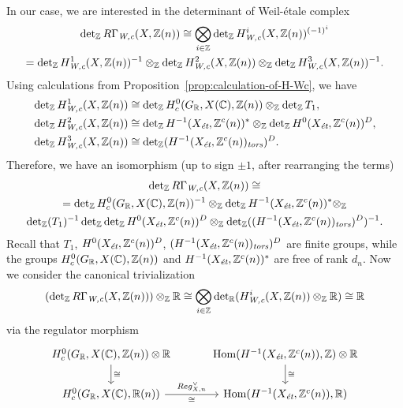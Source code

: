 \documentclass[draft]{article}
\numberwithin{equation}{section}
\begin{document}
In our case, we are interested in the determinant of Weil-\'{e}tale complex
\begin{multline*}
  \det_\ZZ R\Gamma_\Wc (X, \ZZ(n)) \cong
  \bigotimes_{i \in \ZZ} \det_\ZZ H^i_\Wc (X, \ZZ(n))^{(-1)^i} \\
  =
  \det_\ZZ H^1_\Wc (X, \ZZ(n))^{-1} \otimes_\ZZ
  \det_\ZZ H^2_\Wc (X, \ZZ(n)) \otimes_\ZZ
  \det_\ZZ H^3_\Wc (X, \ZZ(n))^{-1}.
\end{multline*}
Using calculations from Proposition~\ref{prop:calculation-of-H-Wc}, we have
\begin{align*}
  \det_\ZZ H^1_\Wc (X, \ZZ(n)) & \cong \det_\ZZ H^0_c (G_\RR, X(\CC), \ZZ(n)) \otimes_\ZZ \det_\ZZ T_1, \\
  \det_\ZZ H^2_\Wc (X, \ZZ(n)) & \cong \det_\ZZ H^{-1} (X_\et, \ZZ^c(n))^* \otimes_\ZZ \det_\ZZ H^0 (X_\et, \ZZ^c(n))^D, \\
  \det_\ZZ H^3_\Wc (X, \ZZ(n)) & \cong \det_\ZZ (H^{-1} (X_\et, \ZZ^c(n))_\tors)^D.
\end{align*}
Therefore, we have an isomorphism (up to sign $\pm 1$, after rearranging the
terms)
\begin{multline*}
  \det_\ZZ R\Gamma_\Wc (X, \ZZ(n)) \cong \\
  =
  \det_\ZZ H^0_c (G_\RR, X(\CC), \ZZ(n))^{-1} \otimes_\ZZ
  \det_\ZZ H^{-1} (X_\et, \ZZ^c(n))^* \otimes_\ZZ \\
  \det_\ZZ (T_1)^{-1} \det_\ZZ  \det_\ZZ H^0 (X_\et, \ZZ^c(n))^D \otimes_\ZZ \det_\ZZ ((H^{-1} (X_\et, \ZZ^c(n))_\tors)^D)^{-1}.
\end{multline*}
Recall that $T_1$, $H^0 (X_\et, \ZZ^c(n))^D$,
$(H^{-1} (X_\et, \ZZ^c(n))_\tors)^D$ are finite groups, while the groups
$H^0_c (G_\RR, X(\CC), \ZZ(n))$ and $H^{-1} (X_\et, \ZZ^c(n))^*$ are free of
rank $d_n$. Now we consider the canonical trivialization
\[ (\det_\ZZ R\Gamma_\Wc (X, \ZZ(n))) \otimes_\ZZ \RR \cong
  \bigotimes_{i\in \ZZ} \det_\RR (H^i_\Wc (X, \ZZ(n))\otimes_\ZZ \RR)
  \cong \RR \]
via the regulator morphism
\[ \begin{tikzcd}[column sep=3em]
    H^0_c (G_\RR, X(\CC), \ZZ(n)) \otimes \RR\ar{d}{\cong} & \Hom (H^{-1} (X_\et, \ZZ^c (n)), \ZZ) \otimes \RR\ar{d}{\cong} \\
    H^0_c (G_\RR, X(\CC), \RR (n)) \ar{r}{Reg^\vee_{X,n}}[swap]{\cong} & \Hom (H^{-1} (X_\et, \ZZ^c (n)), \RR)
  \end{tikzcd} \]
\end{document}
